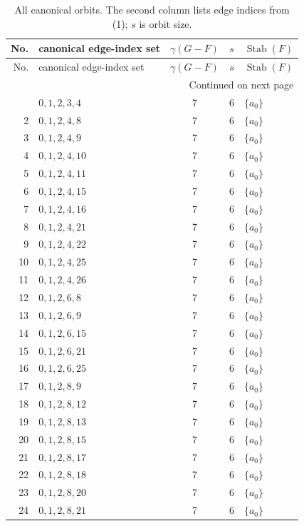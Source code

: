 \begin{longtable}{@{}r l c c l@{}}
\caption{All canonical orbits.  The second column lists edge indices from (1); $s$ is orbit size.\label{tab:orbits}}\\
\toprule
No. & canonical edge-index set & $\gamma(G-F)$ & $s$ & $\operatorname{Stab}(F)$\\
\midrule
\endfirsthead
\toprule
No. & canonical edge-index set & $\gamma(G-F)$ & $s$ & $\operatorname{Stab}(F)$\\
\midrule
\endhead
\midrule
\multicolumn{5}{r}{Continued on next page}\\
\endfoot
\bottomrule
\endlastfoot
1 & $0,1,2,3,4$ & 7 & 6 & $\{a_{0}\}$\\
2 & $0,1,2,4,8$ & 7 & 6 & $\{a_{0}\}$\\
3 & $0,1,2,4,9$ & 7 & 6 & $\{a_{0}\}$\\
4 & $0,1,2,4,10$ & 7 & 6 & $\{a_{0}\}$\\
5 & $0,1,2,4,11$ & 7 & 6 & $\{a_{0}\}$\\
6 & $0,1,2,4,15$ & 7 & 6 & $\{a_{0}\}$\\
7 & $0,1,2,4,16$ & 7 & 6 & $\{a_{0}\}$\\
8 & $0,1,2,4,21$ & 7 & 6 & $\{a_{0}\}$\\
9 & $0,1,2,4,22$ & 7 & 6 & $\{a_{0}\}$\\
10 & $0,1,2,4,25$ & 7 & 6 & $\{a_{0}\}$\\
11 & $0,1,2,4,26$ & 7 & 6 & $\{a_{0}\}$\\
12 & $0,1,2,6,8$ & 7 & 6 & $\{a_{0}\}$\\
13 & $0,1,2,6,9$ & 7 & 6 & $\{a_{0}\}$\\
14 & $0,1,2,6,15$ & 7 & 6 & $\{a_{0}\}$\\
15 & $0,1,2,6,21$ & 7 & 6 & $\{a_{0}\}$\\
16 & $0,1,2,6,25$ & 7 & 6 & $\{a_{0}\}$\\
17 & $0,1,2,8,9$ & 7 & 6 & $\{a_{0}\}$\\
18 & $0,1,2,8,12$ & 7 & 6 & $\{a_{0}\}$\\
19 & $0,1,2,8,13$ & 7 & 6 & $\{a_{0}\}$\\
20 & $0,1,2,8,15$ & 7 & 6 & $\{a_{0}\}$\\
21 & $0,1,2,8,17$ & 7 & 6 & $\{a_{0}\}$\\
22 & $0,1,2,8,18$ & 7 & 6 & $\{a_{0}\}$\\
23 & $0,1,2,8,20$ & 7 & 6 & $\{a_{0}\}$\\
24 & $0,1,2,8,21$ & 7 & 6 & $\{a_{0}\}$\\

\end{longtable}
